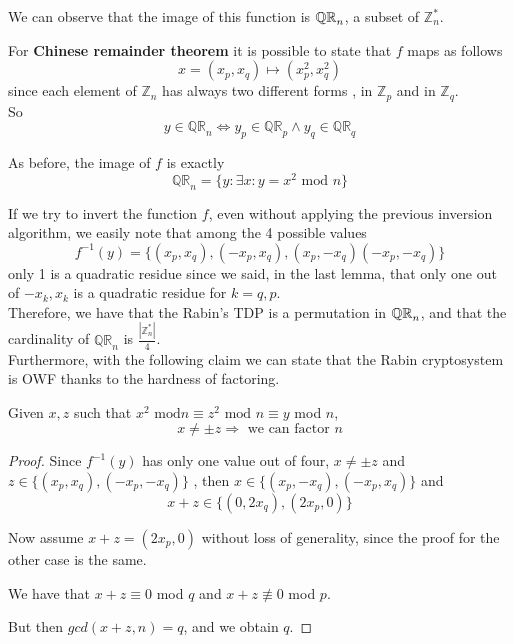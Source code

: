 We can observe that the image of this function is $\QR[n]$, a subset of $\mathbb{Z}^{*}_{n} $.

For \textbf{Chinese remainder theorem} it is possible to state that $f$ maps
as follows
\[
    x= (x_{p}, x_{q}) \mapsto (x^{2}_{p}, x^{2}_{q})
\]
since each element of $ \mathbb{Z}_n$ has always two different forms , in $
\mathbb{Z}_{p} $ and in $ \mathbb{Z}_{q} $.\\

So
\[
y \in  \mathbb{QR}_{n} \Leftrightarrow y_{p} \in \mathbb{QR}_{p} \wedge y_{q} \in
\mathbb{QR}_{q} 
\]

As before, the image of $f$ is exactly
\[
    \mathbb{QR}_{n} = \{ y: \exists x : y=x^{2} \text{ mod } n\}
\]

If we try to invert the function $f$, even without applying the previous
inversion algorithm, we easily note that among the 4 possible values
\[
    f^{-1}(y)=\{ (x_{p}, x_{q}),(-x_{p}, x_{q}),(x_{p},- x_{q})(-x_{p},- x_{q})\}
\]\label{les15:outoffour}
only 1 is a quadratic residue since we said, in the
last lemma, that only one out of
$-x_{k}, x_{k}$ is a quadratic residue for $k=q,p$.\\

Therefore, we have that the Rabin's TDP is a permutation in $\QR[n]$, and that the cardinality of $ \mathbb{QR}_{n} $ is $\frac{|\mathbb{Z}^{*}_{n} |}{4}$.\\

Furthermore, with the following claim we can state that the Rabin cryptosystem
is OWF thanks to the hardness of factoring.

\begin{claim}
    Given $x, z$ such that $x^{2}\text{ mod} n \equiv z^{2} \text{ mod } n
    \equiv y$ mod $n$,
\[
    x\not= \pm z \Rightarrow \text{ we can factor } n
\]
\end{claim}
\begin{proof}
    Since $f^{-1}(y)$ has only one value out of four, $x\neq \pm z$ and
    $z\in \{(x_{p},x_{q}),(-x_{p},-x_{q})\}$ , then
    $x \in \{(x_{p},-x_{q}),(-x_{p},x_{q})\}$ and 
    \[
        x + z \in \{(0,2x_{q}), (2x_{p}, 0)\}
    \]

    Now assume $x + z = (2x_{p}, 0)$ without loss of generality, since the proof for the other case is the same.

    We have that $x+z \equiv 0$ mod $q$ and $x+z \not\equiv 0 $ mod $p$.

    But then $gcd( x+z , n)=q$, and we obtain $q$.
\end{proof}

